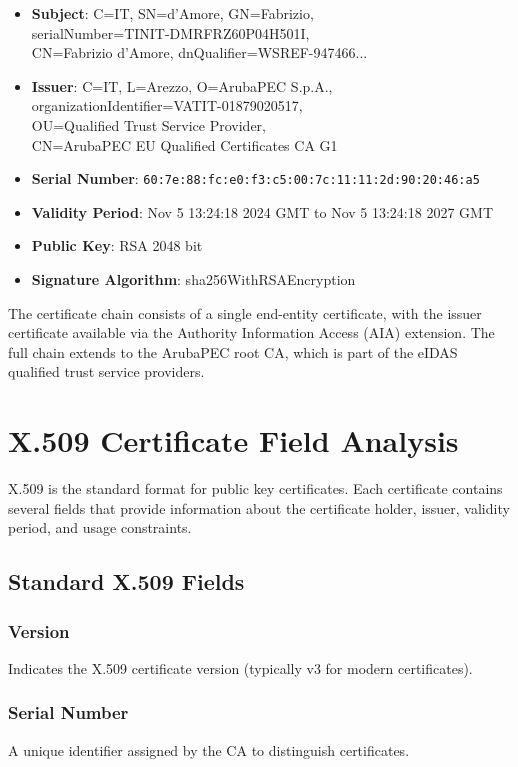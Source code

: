 \documentclass[12pt,a4paper]{article}
\begin{document}
\begin{itemize}
    \item \textbf{Subject}: C=IT, SN=d'Amore, GN=Fabrizio, \\serialNumber=TINIT-DMRFRZ60P04H501I, \\CN=Fabrizio d'Amore, dnQualifier=WSREF-947466...
    \item \textbf{Issuer}: C=IT, L=Arezzo, O=ArubaPEC S.p.A., \\organizationIdentifier=VATIT-01879020517, \\OU=Qualified Trust Service Provider, \\CN=ArubaPEC EU Qualified Certificates CA G1
    \item \textbf{Serial Number}: \texttt{60:7e:88:fc:e0:f3:c5:00:\allowbreak 7c:11:11:2d:90:20:46:a5}
    \item \textbf{Validity Period}: Nov 5 13:24:18 2024 GMT to Nov 5 13:24:18 2027 GMT
    \item \textbf{Public Key}: RSA 2048 bit
    \item \textbf{Signature Algorithm}: sha256WithRSAEncryption
\end{itemize}

The certificate chain consists of a single end-entity certificate, with the issuer certificate available via the Authority Information Access (AIA) extension. The full chain extends to the ArubaPEC root CA, which is part of the eIDAS qualified trust service providers.

\section{X.509 Certificate Field Analysis}

X.509 is the standard format for public key certificates. Each certificate contains several fields that provide information about the certificate holder, issuer, validity period, and usage constraints.

\subsection{Standard X.509 Fields}

\subsubsection{Version}
Indicates the X.509 certificate version (typically v3 for modern certificates).

\subsubsection{Serial Number}
A unique identifier assigned by the CA to distinguish certificates.
\end{document}
